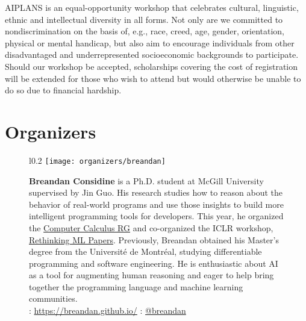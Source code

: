 \documentclass{article}
\begin{document}
    AIPLANS is an equal-opportunity workshop that celebrates cultural, linguistic, ethnic and intellectual diversity in all forms. Not only are we committed to nondiscrimination on the basis of, e.g., race, creed, age, gender, orientation, physical or mental handicap, but also aim to encourage individuals from other disadvantaged and underrepresented socioeconomic backgrounds to participate. Should our workshop be accepted, scholarships covering the cost of registration will be extended for those who wish to attend but would otherwise be unable to do so due to financial hardship.


    \newpage


    \section*{Organizers}\vspace{-0.5cm}
    \begin{figure}[H]
        \begin{wrapfigure}{l}{0.2\textwidth}
            \texttt{[image: organizers/breandan]}
        \end{wrapfigure}
        \textbf{Breandan Considine} is a Ph.D. student at McGill University supervised by Jin Guo. His research studies how to reason about the behavior of real-world programs and use those insights to build more intelligent programming tools for developers. This year, he organized the \href{https://compcalc.github.io/}{Computer Calculus RG} and co-organized the ICLR workshop, \href{https://rethinkingmlpapers.github.io/}{Rethinking ML Papers}. Previously, Breandan obtained his Master's degree from the Universit\'e de Montr\'eal, studying differentiable programming and software engineering. He is enthusiastic about AI as a tool for augmenting human reasoning and eager to help bring together the programming language and machine learning communities.\\
        \faHome: \url{https://breandan.github.io/} \faTwitter: \href{https://twitter.com/breandan}{@breandan}
    \end{figure}
\end{document}
